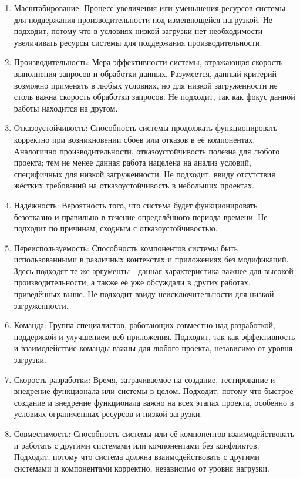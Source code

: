     \begin{enumerate}
        \item Масштабирование: Процесс увеличения или уменьшения ресурсов системы для поддержания производительности под изменяющейся нагрузкой. Не подходит, потому что в условиях низкой загрузки нет необходимости увеличивать ресурсы системы для поддержания производительности.
        \item Производительность: Мера эффективности системы, отражающая скорость выполнения запросов и обработки данных. Разумеется, данный критерий возможно применять в любых условиях, но для низкой загруженности не столь важна скорость обработки запросов. Не подходит, так как фокус данной работы находится на другом.
        \item Отказоустойчивость: Способность системы продолжать функционировать корректно при возникновении сбоев или отказов в её компонентах. Аналогично производительности, отказоустойчивость полезна для любого проекта; тем не менее данная работа нацелена на анализ условий, специфичных для низкой загруженности. Не подходит, ввиду отсутствия жёстких требований на отказоустойчивость в небольших проектах.
        \item Надёжность: Вероятность того, что система будет функционировать безотказно и правильно в течение определённого периода времени. Не подходит по причинам, сходным с отказоустойчивостью.
        \item Переиспользуемость: Способность компонентов системы быть использованными в различных контекстах и приложениях без модификаций. Здесь подходят те же аргументы - данная характеристика важнее для высокой производительности, а также её уже обсуждали в других работах, приведённых выше. Не подходит ввиду неисключительности для низкой загруженности.
        \item Команда: Группа специалистов, работающих совместно над разработкой, поддержкой и улучшением веб-приложения. Подходит, так как эффективность и взаимодействие команды важны для любого проекта, независимо от уровня загрузки.
        \item Скорость разработки: Время, затрачиваемое на создание, тестирование и внедрение функционала или системы в целом. Подходит, потому что быстрое создание и внедрение функционала важно на всех этапах проекта, особенно в условиях ограниченных ресурсов и низкой загрузки.
        \item Совместимость: Способность системы или её компонентов взаимодействовать и работать с другими системами или компонентами без конфликтов. Подходит, потому что система должна взаимодействовать с другими системами и компонентами корректно, независимо от уровня нагрузки.

\end{enumerate}
